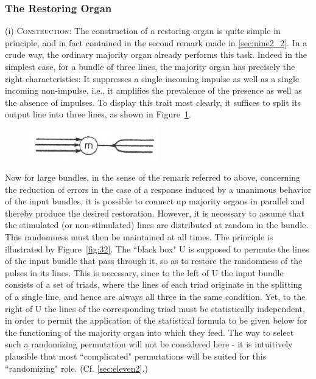 \documentclass[twocolumn,preprintnumbers,amsmath,amssymb,floatfix]{revtex4}
\begin{document}
\subsubsection{\label{sec:nine2_3}The Restoring Organ}

\noindent (i) \textsc{Construction}: The construction of a
restoring organ is quite simple in principle, and in fact
contained in the second remark made in \ref{sec:nine2_2}. In a
crude way, the ordinary majority organ already performs this task.
Indeed in the simplest case, for a bundle of three lines, the
majority organ has precisely the right characteristics: It
suppresses a single incoming impulse as well as a single incoming
non-impulse, i.e., it amplifies the prevalence of the presence as
well as the absence of impulses. To display this trait most
clearly, it suffices to split its output line into three lines, as
shown in Figure~\ref{fig:31}.

\begin{figure}[b]
\includegraphics[width=2.2in]{fig_31}
\caption{\label{fig:31}}
\end{figure}

Now for large bundles, in the sense of the remark referred to
above, concerning the reduction of errors in the case of a
response induced by a unanimous behavior of the input bundles, it
is possible to connect up majority organs in parallel and thereby
produce the desired restoration. However, it is necessary to
assume that the stimulated (or non-stimulated) lines are
distributed at random in the bundle. This randomness must then be
maintained at all times. The principle is illustrated by
Figure~\ref{fig:32}. The ``black box" \textsf{U} is supposed to
permute the lines of the input bundle that pass through it, so as
to restore the randomness of the pulses in its lines. This is
necessary, since to the left of \textsf{U} the input bundle
consists of a set of triads, where the lines of each triad
originate in the splitting of a single line, and hence are always
all three in the same condition. Yet, to the right of \textsf{U}
the lines of the corresponding triad must be statistically
independent, in order to permit the application of the statistical
formula to be given below for the functioning of the majority
organ into which they feed. The way to select such a randomizing
permutation will not be considered here - it is intuitively
plausible that most ``complicated" permutations will be suited for
this ``randomizing" role. (Cf. \ref{sec:eleven2}.)\\
\end{document}
